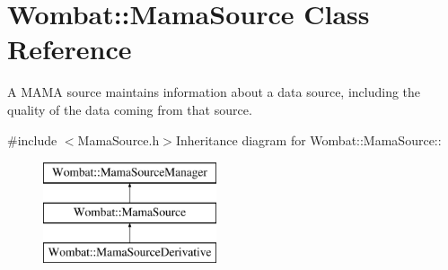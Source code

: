 \hypertarget{classWombat_1_1MamaSource}{
\section{Wombat::MamaSource Class Reference}
\label{classWombat_1_1MamaSource}
}


A MAMA source maintains information about a data source, including the quality of the data coming from that source.  


{\ttfamily \#include $<$MamaSource.h$>$}Inheritance diagram for Wombat::MamaSource::\begin{figure}[H]
\begin{center}
\leavevmode
\includegraphics[height=3cm]{classWombat_1_1MamaSource}
\end{center}
\end{figure}
